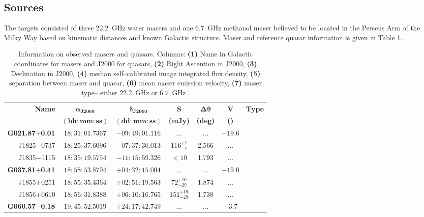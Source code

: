 		\subsection{Sources}
			The targets consisted of three 22.2~GHz water masers and one 6.7~GHz methanol maser believed to be located in the Perseus Arm of the Milky Way based on kinematic distances and known Galactic structure. Maser and reference quasar information is given in \hyperref[tab:br210_targets]{Table \ref*{tab:br210_targets}}.
			\begin{table}[h]
				\onehalfspacing
				\footnotesize
				\centering
				\caption[Observed BeSSeL masers]{Information on observed masers and quasars. Columns: \textbf{(1)} Name in Galactic coordinates for masers and J2000 for quasars, \textbf{(2)} Right Ascention in J2000, \textbf{(3)} Declination in J2000, \textbf{(4)} median self--calibrated image integrated flux density, \textbf{(5)} separation between maser and quasar, \textbf{(6)} mean maser emission velocity, \textbf{(7)} maser type-- either 22.2~GHz \water\space or 6.7~GHz \choh.}
				\label{tab:br210_targets}
				\begin{tabular}{rcccccc}
					\toprule
					\textbf{Name}&$\boldsymbol{\alpha_{J2000}}$&$\boldsymbol{\delta_{J2000}}$&$\boldsymbol{S}$&$\boldsymbol{\Delta\theta}$&$\boldsymbol{V}$&{\bf Type}\\
					&$\boldsymbol{(hh:mm:ss)}$&$\boldsymbol{(dd:mm:ss)}$&{\bf(mJy)}&{\bf(deg)}&{\bf(\kms)}&\\
					\midrule
					\textbf{G021.87$+$0.01}   & $18:31:01.7367$ & $-09:49:01.116$ & ...                  & ...   &$+19.6$ & \water\\
					J1825$-$0737     & $18:25:37.6096$ & $-07:37:30.013$ & $116^{+1}_{-1}$      & 2.566 &  ...   &       \\        
					J1835$-$1115     & $18:35:19.5754$ & $-11:15:59.326$ & $<10$                & 1.793 &  ...   &       \\\hline 
					\textbf{G037.81$+$0.41}  & $18:58:53.8794$ & $+04:32:15.004$& ...                  & ...   &$+19.0$ & \water\\
					J1855$+$0251     & $18:55:35.4364$ & $+02:51:19.563$ & $72^{+16}_{-29}$     & 1.874 &  ...   &       \\
					J1856$+$0610     & $18:56:31.8388$ & $+06:10:16.765$ & $151^{+19}_{-29}$    & 1.738 &  ...   &       \\\hline
					\textbf{G060.57$-$0.18}  & $19:45:52.5019$ & $+24:17:42.749$ & ...                  & ...   &$+3.7$  & \choh \\

\end{tabular}
\end{table}
